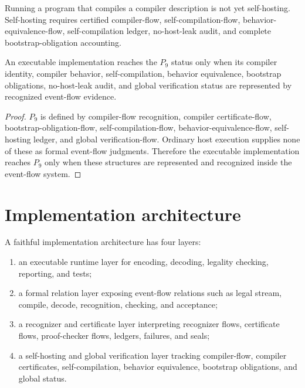 \begin{principle}
\label{prin:programmatic-self-hosting-not-execution}
Running a program that compiles a compiler description is not yet self-hosting. Self-hosting requires certified compiler-flow, self-compilation-flow, behavior-equivalence-flow, self-compilation ledger, no-host-leak audit, and complete bootstrap-obligation accounting.
\end{principle}

\begin{theorem}
\label{thm:programmatic-realization-reaches-p9-with-evidence}
An executable implementation reaches the $P_9$ status only when its compiler identity, compiler behavior, self-compilation, behavior equivalence, bootstrap obligations, no-host-leak audit, and global verification status are represented by recognized event-flow evidence.
\end{theorem}

\begin{proof}
$P_9$ is defined by compiler-flow recognition, compiler certificate-flow, bootstrap-obligation-flow, self-compilation-flow, behavior-equivalence-flow, self-hosting ledger, and global verification-flow. Ordinary host execution supplies none of these as formal event-flow judgments. Therefore the executable implementation reaches $P_9$ only when these structures are represented and recognized inside the event-flow system.
\end{proof}

\section{Implementation architecture}
\label{sec:programmatic-implementation-architecture}

\begin{definition}
\label{def:programmatic-four-implementation-layers}
A faithful implementation architecture has four layers:
\begin{enumerate}
\item an executable runtime layer for encoding, decoding, legality checking, reporting, and tests;
\item a formal relation layer exposing event-flow relations such as legal stream, compile, decode, recognition, checking, and acceptance;
\item a recognizer and certificate layer interpreting recognizer flows, certificate flows, proof-checker flows, ledgers, failures, and seals;
\item a self-hosting and global verification layer tracking compiler-flow, compiler certificates, self-compilation, behavior equivalence, bootstrap obligations, and global status.
\end{enumerate}
\end{definition}

